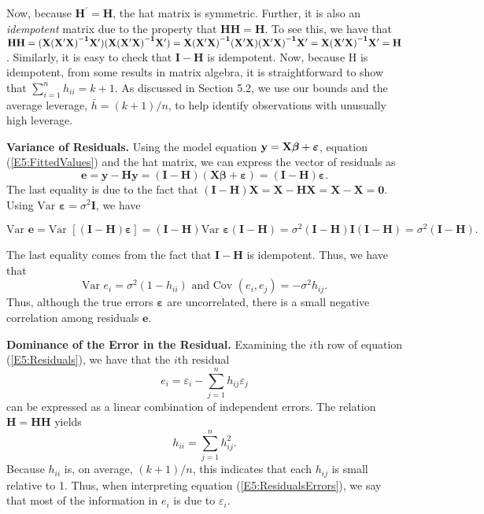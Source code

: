 Now, because $\mathbf{H}^{\prime }=\mathbf{H}$, the hat matrix is
symmetric. Further, it is also an \textit{idempotent} matrix due to the property that $%
\mathbf{HH}=\mathbf{H}$. To see this, we have that $\mathbf{HH}=\mathbf{(X(%
\mathbf{X}^{\prime }X)}^{\mathbf{-1}}\mathbf{X}^{\prime }\mathbf{)(X(\mathbf{%
X}^{\prime }X)}^{\mathbf{-1}}\mathbf{X}^{\prime }\mathbf{)}=\mathbf{X(%
\mathbf{X}^{\prime }X)}^{\mathbf{-1}}\mathbf{(\mathbf{X}^{\prime }X)(\mathbf{%
X}^{\prime }X)}^{\mathbf{-1}}\mathbf{X}^{\prime }=\mathbf{X(\mathbf{X}%
^{\prime }X)}^{\mathbf{-1}}\mathbf{X}^{\prime }=\mathbf{H}$.
Similarly, it is easy to check that $\mathbf{I-H}$ is idempotent.
Now, because H is idempotent, from some results in matrix algebra,
it is straightforward to show that $\sum_{i=1}^{n}h_{ii}=k+1$. As
discussed in Section 5.2, we use our bounds and the average
leverage, $\bar{h}=(k+1)/n$, to help identify observations with
unusually high leverage.

\textbf{Variance of Residuals.} Using the model equation $\mathbf{y}=\mathbf{%
X \boldsymbol \beta + \boldsymbol \varepsilon}$, equation
(\ref{E5:FittedValues}) and the hat matrix, we can express the
vector of residuals as
\begin{equation}\label{E5:Residuals}
\mathbf{e}=\mathbf{y-Hy}=\mathbf{(I-H)(X \boldsymbol \beta
+\boldsymbol \varepsilon)}=\mathbf{(I-H) \boldsymbol \varepsilon}.
\end{equation}
The last equality is due to the fact that $\mathbf{(I-H)X}=\mathbf{X-HX}=%
\mathbf{X-X}=\mathbf{0}$. Using $\text{Var } \boldsymbol \varepsilon
= \sigma ^2 \mathbf{I}$, we have
\begin{center}
\[
\text{Var }\mathbf{e}=\text{Var }\left[ \mathbf{(I-H)\boldsymbol \varepsilon}\right] =%
\mathbf{(I-H)}\text{Var }\boldsymbol \varepsilon \mathbf{(I-H)}=\sigma ^{2}\mathbf{(I-H)I(I-H)}%
=\sigma ^{2}\mathbf{(I-H)}.
\]
\end{center}
The last equality comes from the fact that $\mathbf{I-H}$ is
idempotent. Thus, we have that
\begin{equation}\label{E5:VarResiduals}
\text{Var }e_{i}=\sigma ^{2}(1-h_{ii})\text{ \ and \ Cov }%
(e_{i},e_{j})=-\sigma ^{2}h_{ij}.
\end{equation}
Thus, although the true errors $\boldsymbol \varepsilon$ are
uncorrelated, there is a small negative correlation among residuals
$\mathbf e$.

\textbf{Dominance of the Error in the Residual.} Examining the $i$th
row of equation (\ref{E5:Residuals}), we have that the $i$th
residual
\begin{equation}\label{E5:ResidualsErrors}
e_{i}=\varepsilon_{i} - \sum_{j=1}^{n} h_{ij} \varepsilon_{j}
\end{equation}
can be expressed as a linear combination of independent errors. The
relation $ \mathbf{H}=\mathbf{HH}$ yields
\begin{equation}\label{E5:Leverages}
h_{ii}=\sum_{j=1}^{n} h_{ij}^{2}.
\end{equation}
Because $h_{ii}$ is, on average, $(k+1)/n$, this indicates that each
$h_{ij}$ is small relative to 1. Thus, when interpreting equation
(\ref{E5:ResidualsErrors}), we say that most of the information in
$e_{i}$ is due to $\varepsilon_{i}$.

